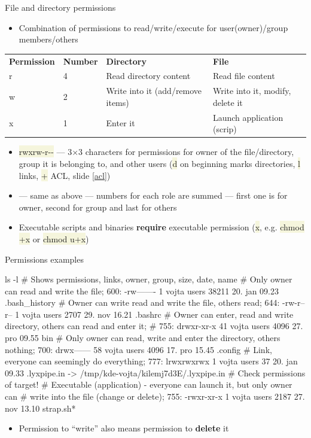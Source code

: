 \documentclass[compress, ucs, xelatex, 11pt, xcolor=svgnames, aspectratio=169,
	hyperref={
		bookmarks=true,
		unicode=true,
		colorlinks=true,
		pdftitle={Linux, command line and MetaCentrum},
		plainpages=false,
		pdfauthor={Vojtech Zeisek},
		pdfsubject={Course about use of Linux command line, writing shell scripts and using MetaCentrum of CESNET},
		pdfcreator={XeLaTeX},
		pdfkeywords={Linux, GNU, BASH, shell, command line, MetaCentrum},
		linkcolor=DarkRed, %
		anchorcolor=DarkBlue, %
		citecolor=Indigo, %
		filecolor=NavyBlue, %
		menucolor=DarkMagenta, %
		urlcolor=DarkBlue, %
		pdftex},
	url={hyphens, lowtilde} %
	]{beamer}
\renewcommand{\texttt}[1]{\colorbox{Beige}{{\ttfamily #1}}}
\begin{document}
\begin{frame}{File and directory permissions}
	\label{permissions}
	\begin{itemize}
		\item Combination of permissions to read/write/execute for user(owner)/group members/others
	\end{itemize}
	\begin{center}
		\begin{tabular}{llll}
			\textbf{Permission} & \textbf{Number} & \textbf{Directory} & \textbf{File}\\
			r & 4 & Read directory content & Read file content\\
			w & 2 & Write into it (add/remove items) & Write into it, modify, delete it\\
			x & 1 & Enter it & Launch application (scrip)
		\end{tabular}
	\end{center}
	\begin{itemize}
		\item \texttt{rwxrw-r-{-}} --- 3$\times$3 characters for permissions for owner of the file/directory, group it is belonging to, and other users (\texttt{d} on beginning marks directories, \texttt{l} links, \texttt{+} ACL, slide \ref{acl})
		\item \texttt{764} --- same as above --- numbers for each role are summed --- first one is for owner, second for group and last for others
		\item Executable scripts and binaries \textbf{require} executable permission (\texttt{x}, e.g. \texttt{chmod +x} or \texttt{chmod u+x})
	\end{itemize}
\end{frame}

\begin{frame}[fragile]{Permissions examples}
	\begin{bashcode}
    ls -l # Shows permissions, links, owner, group, size, date, name
    # Only owner can read and write the file; 600:
    -rw-------   1 vojta users   38211 20. jan 09.23 .bash_history
    # Owner can write read and write the file, others read; 644:
    -rw-r--r--   1 vojta users    2707 29. nov 16.21 .bashrc
    # Owner can enter, read and write directory, others can read and enter it;
    # 755:
    drwxr-xr-x  41 vojta users    4096 27. pro 09.55 bin
    # Only owner can read, write and enter the directory, others nothing; 700:
    drwx------  58 vojta users    4096 17. pro 15.45 .config
    # Link, everyone can seemingly do everything; 777:
    lrwxrwxrwx   1 vojta users      37 20. jan 09.33 .lyxpipe.in ->
      /tmp/kde-vojta/kilemj7d3E/.lyxpipe.in # Check permissions of target!
    # Executable (application) - everyone can launch it, but only owner can
    # write into the file (change or delete); 755:
    -rwxr-xr-x   1 vojta users    2187 27. nov 13.10 strap.sh*
	\end{bashcode}
	\vfill
	\begin{itemize}
		\item Permission to \enquote{write} also means permission to \textbf{delete} it
	\end{itemize}
\end{frame}
\end{document}
